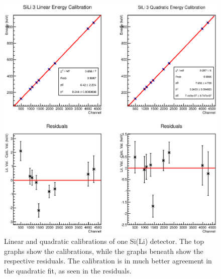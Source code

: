 \begin{figure}
    \centering
    \includegraphics[scale=0.75]{Setup_Figs/sili_3.eps}
    \caption{Linear and quadratic calibrations of one Si(Li) detector. The top graphs show the calibrations, while the graphs beneath show the respective residuals. The calibration is in much better agreement in the quadratic fit, as seen in the residuals.}
    \label{fig:iceball_cal}
\end{figure}